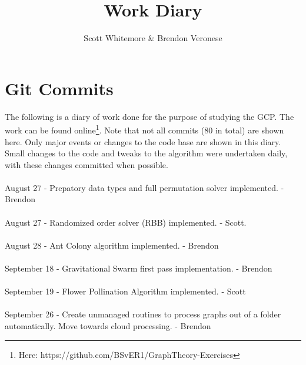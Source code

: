 \documentclass{report}%
\begin{document}
\title{Work Diary}
\author{Scott Whitemore \& Brendon Veronese}


\maketitle

\section{Git Commits}
The following is a diary of work done for the purpose of studying the GCP.
The work can be found online\footnote{Here: https://github.com/BSvER1/GraphTheory-Exercises}. Note that not all commits (80 in total) are shown here. Only major events or changes to the code base are shown in this diary. Small changes to the code and tweaks to the algorithm were undertaken daily, with these changes committed when possible. 

\paragraph*{}August 27 - Prepatory data types and full permutation solver implemented. - Brendon

\paragraph*{}August 27 - Randomized order solver (RBB) implemented. - Scott.

\paragraph*{}August 28 - Ant Colony algorithm implemented. - Brendon

\paragraph*{}September 18 - Gravitational Swarm first pass implementation. - Brendon

\paragraph*{}September 19 - Flower Pollination Algorithm implemented. - Scott

\paragraph*{}September 26 - Create unmanaged routines to process graphs out of a folder automatically. Move towards cloud processing. - Brendon
\end{document}
